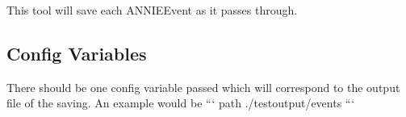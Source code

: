 This tool will save each A\-N\-N\-I\-E\-Event as it passes through.

\subsection*{Config Variables}

There should be one config variable passed which will correspond to the output file of the saving. An example would be ``` path ./testoutput/events ``` 